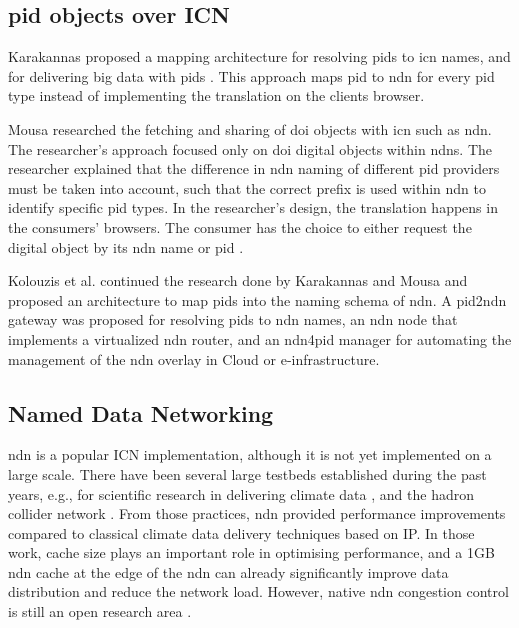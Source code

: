 \documentclass[conference]{IEEEtran}
\begin{document}

\subsection{\gls{pid} objects over ICN}
Karakannas proposed a mapping architecture for resolving \glspl{pid} to \gls{icn} names, and  for delivering big data with \glspl{pid} \cite{icn-bd}. This approach maps \gls{pid} to \gls{ndn} for every \gls{pid} type instead of implementing the translation on the clients browser.

Mousa researched the fetching and sharing of \gls{doi} objects with \gls{icn} such as \gls{ndn}. The researcher's approach focused only on \gls{doi} digital objects within \glspl{ndn}. The researcher explained that the difference in \gls{ndn} naming of different \gls{pid} providers must be taken into account, such that the correct prefix is used within \gls{ndn} to identify specific \gls{pid} types. In the researcher's design, the translation happens in the consumers' browsers. The consumer has the choice to either request the digital object by its \gls{ndn} name or \gls{pid} \cite{ndn-app-aware}.

Kolouzis et al. continued the research done by Karakannas \cite{icn-bd} and Mousa \cite{ndn-app-aware} and proposed an architecture to map \glspl{pid} into the naming schema of \gls{ndn}. A \gls{pid}2\gls{ndn} gateway was proposed for resolving \glspl{pid} to \gls{ndn} names, an \gls{ndn} node that implements a virtualized \gls{ndn} router, and an \gls{ndn}4\gls{pid} manager for automating the management of the \gls{ndn} overlay in Cloud or e-infrastructure.

\subsection{Named Data Networking}
\gls{ndn} is a popular ICN implementation, although it is not yet implemented on a large scale. There have been several large testbeds established during the past years, e.g., for scientific research in delivering climate data \cite{lim2018ndn}, and the hadron collider network \cite{shannigrahi2015named}. From those practices, \gls{ndn} provided performance improvements compared to classical climate data delivery techniques based on IP. In those work, cache size plays an important role in optimising performance, and a 1GB \gls{ndn} cache at the edge of the \gls{ndn} can already significantly improve data distribution and reduce the network load. However, native \gls{ndn} congestion control is still an open research area \cite{ren2016congestion}.
 
\end{document}
